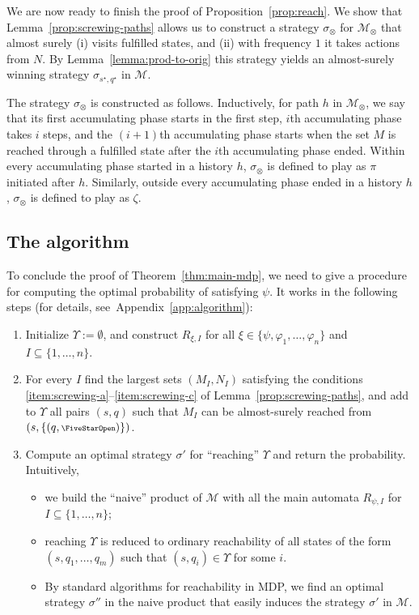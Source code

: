 \documentclass[a4paper,UKenglish]{lipics}
\newcommand{\symbopen}{\text{\scriptsize\FiveStarOpen}}
\newcommand{\mdp}{\mathcal{M}}
\newcommand{\rabin}{R}
\newcommand{\fix}[1]{{#1^\star}}
\newcommand{\fixs}{\fix{s}}
\newcommand{\fixq}{\fix{q}}
\newcommand{\citeapp}[1]{Appendix~\ref{#1}}
\begin{document}
We are now ready to finish the proof of Proposition~\ref{prop:reach}. We show that Lemma~\ref{prop:screwing-paths} allows us to
construct a strategy $\sigma_\otimes$ for $\mdp_\otimes$ that almost surely (i) visits fulfilled states, and (ii) with frequency $1$ it takes actions from $N$. By Lemma~\ref{lemma:prod-to-orig} this strategy yields an almost-surely winning strategy $\sigma_{\fixs,\fixq}$ in $\mdp$.

The strategy $\sigma_\otimes$ is constructed as follows.
Inductively, for path $h$ in $\mdp_\otimes$, we say that its first accumulating phase starts in the first step, $i$th accumulating phase takes $i$ steps, and the $(i+1)$th accumulating phase starts when the set $M$ is reached through a fulfilled state after the $i$th accumulating phase ended.
Within every accumulating phase started in a history $h$, $\sigma_\otimes$ is defined to play as $\pi$ initiated after $h$. Similarly, outside every accumulating phase ended in a history $h$, $\sigma_\otimes$ is defined to play as $\zeta$.

\subsection{The algorithm}
\label{sec:alg}
To conclude the proof of Theorem~\ref{thm:main-mdp}, we need to give a procedure for  
computing the optimal probability of satisfying $\psi$.
It works in the following steps (for details, see~\citeapp{app:algorithm}):
\begin{enumerate}
	\item\label{item:alg-a} Initialize $\Upsilon := \emptyset$, and construct $\rabin_{\xi,I}$ for all $\xi\in \{\psi,\varphi_1,\ldots,\varphi_n\}$ and $I\subseteq \{1,\ldots,n\}$.
\item\label{item:alg-b} For every $I$ 
find the largest sets $(M_I,N_I)$ satisfying the conditions \ref{item:screwing-a}--\ref{item:screwing-c} of Lemma~\ref{prop:screwing-paths}, and add to $\Upsilon$ all pairs $(s,q)$ such that $M_I$ can be almost-surely reached from 
	$(s,\{(q,\symbopen)\})$.
\item\label{item:reach} Compute an optimal strategy $\sigma'$ for ``reaching'' $\Upsilon$  and return the probability. Intuitively,
	\begin{itemize}
		\item we build the ``naive'' product of $\mdp$ with all the main automata $\rabin_{\psi,I}$ for $I\subseteq \{1,\ldots,n\}$;
\item 
		reaching $\Upsilon$ is reduced to ordinary reachability of all states of the form $(s,q_1,\ldots,q_m)$ such that $(s,q_i)\in \Upsilon$ for some $i$.
\item
		By standard algorithms for reachability in MDP, we find an optimal strategy $\sigma''$ in the naive product that easily induces the strategy $\sigma'$ in $\mdp$.
	\end{itemize}
\end{enumerate}
\end{document}
